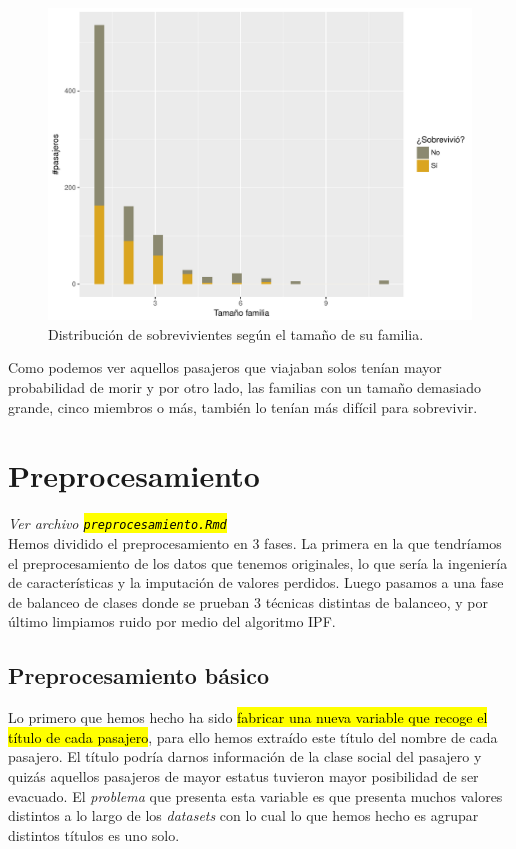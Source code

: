 \documentclass[10pt,a4paper]{article}
\newcommand{\emp}[1]{\sethlcolor{light-yellow}\hl{#1}} %
\newcommand{\archive}[1]{\sethlcolor{light-blue}\hl{\texttt{#1}}} %
\begin{document}
\begin{figure}[H]
  \centering
  \includegraphics[width=\textwidth]{imgs/fsize.pdf}
  \caption{Distribución de sobrevivientes según el tamaño de su familia.}
\end{figure}

Como podemos ver aquellos pasajeros que viajaban solos tenían mayor probabilidad de morir y por otro lado, las familias con un tamaño demasiado grande, cinco miembros o más, también lo tenían más difícil para sobrevivir.

\section{Preprocesamiento} \emph{Ver archivo \archive{preprocesamiento.Rmd}}\\

Hemos dividido el preprocesamiento en 3 fases. La primera en la que tendríamos el preprocesamiento de los datos que tenemos originales, lo que sería la ingeniería de características y la imputación de valores perdidos. Luego pasamos a una fase de balanceo de clases donde se prueban 3 técnicas distintas de balanceo, y por último limpiamos ruido por medio del algoritmo IPF.

\subsection{Preprocesamiento básico}


Lo primero que hemos hecho ha sido \emp{fabricar una nueva variable que recoge el título de cada pasajero}, para ello hemos extraído este título del nombre de cada pasajero. El título podría darnos información de la clase social del pasajero y quizás aquellos pasajeros de mayor estatus tuvieron mayor posibilidad de ser evacuado. El \textit{problema} que presenta esta variable es que presenta muchos valores distintos a lo largo de los \textit{datasets} con lo cual lo que hemos hecho es agrupar distintos títulos es uno solo.\\
\end{document}
